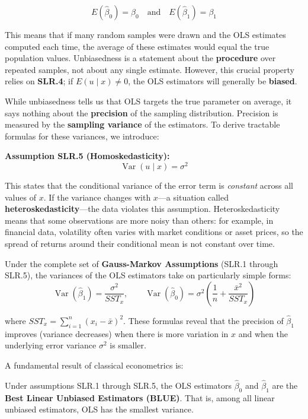 \begin{theorem}
$$E(\hat{\beta}_0) = \beta_0 \quad \text{and} \quad E(\hat{\beta}_1) = \beta_1$$
\end{theorem}

This means that if many random samples were drawn and the OLS estimates computed each time, the average of these estimates would equal the true population values. Unbiasedness is a statement about the \textbf{procedure} over repeated samples, not about any single estimate. However, this crucial property relies on \textbf{SLR.4}; if $E(u \mid x) \neq 0$, the OLS estimators will generally be \textbf{biased}.

While unbiasedness tells us that OLS targets the true parameter on average, it says nothing about the \textbf{precision} of the sampling distribution. Precision is measured by the \textbf{sampling variance} of the estimators. To derive tractable formulas for these variances, we introduce:

\textbf{Assumption SLR.5 (Homoskedasticity):}
$$\operatorname{Var}(u \mid x) = \sigma^2$$

This states that the conditional variance of the error term is \emph{constant} across all values of $x$. If the variance changes with $x$---a situation called \textbf{heteroskedasticity}---the data violates this assumption. Heteroskedasticity means that some observations are more noisy than others: for example, in financial data, volatility often varies with market conditions or asset prices, so the spread of returns around their conditional mean is not constant over time.

Under the complete set of \textbf{Gauss-Markov Assumptions} (SLR.1 through SLR.5), the variances of the OLS estimators take on particularly simple forms:
$$\operatorname{Var}(\hat{\beta}_1) = \frac{\sigma^2}{SST_x}, \qquad \operatorname{Var}(\hat{\beta}_0) = \sigma^2\left(\frac{1}{n} + \frac{\bar{x}^2}{SST_x}\right)$$

where $SST_x = \sum_{i=1}^{n}(x_i - \bar{x})^2$. These formulas reveal that the precision of $\hat{\beta}_1$ improves (variance decreases) when there is more variation in $x$ and when the underlying error variance $\sigma^2$ is smaller.

A fundamental result of classical econometrics is:

\begin{theorem}
Under assumptions SLR.1 through SLR.5, the OLS estimators $\hat{\beta}_0$ and $\hat{\beta}_1$ are the \textbf{Best Linear Unbiased Estimators (BLUE)}. That is, among all linear unbiased estimators, OLS has the smallest variance.
\end{theorem}

